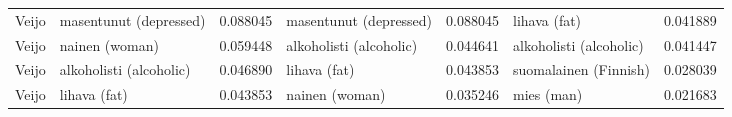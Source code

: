 \begin{tabular}{llrlrlr}
 Veijo &     masentunut (depressed) &                         0.088045 &     masentunut (depressed) &                              0.088045 &               lihava (fat) &                        0.041889 \\
 Veijo &             nainen (woman) &                         0.059448 &    alkoholisti (alcoholic) &                              0.044641 &    alkoholisti (alcoholic) &                        0.041447 \\
 Veijo &    alkoholisti (alcoholic) &                         0.046890 &               lihava (fat) &                              0.043853 &      suomalainen (Finnish) &                        0.028039 \\
 Veijo &               lihava (fat) &                         0.043853 &             nainen (woman) &                              0.035246 &                 mies (man) &                        0.021683 \\
\bottomrule
\end{tabular}
